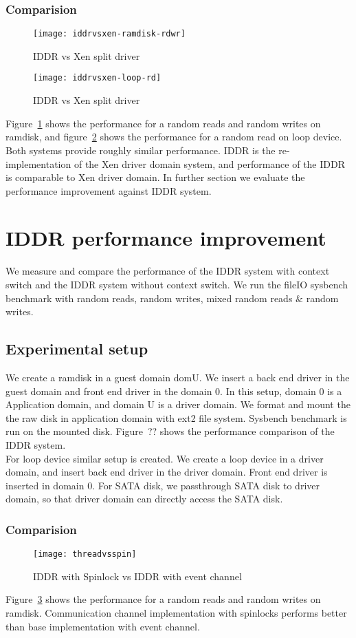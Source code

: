 \subsubsection*{Comparision}
\begin{figure}[!ht]
\centering
\texttt{[image: iddrvsxen-ramdisk-rdwr]}
\caption{IDDR vs Xen split driver}
\label{fig:iddrvsxen-ramdisk-rdwr}
\end{figure}
\begin{figure}[!ht]
\centering
\texttt{[image: iddrvsxen-loop-rd]}
\caption{IDDR vs Xen split driver}
\label{fig:iddrvsxen-loop-rd}
\end{figure}
Figure~\ref{fig:iddrvsxen-ramdisk-rdwr} shows the performance for a random reads and random writes on ramdisk, and figure~\ref{fig:iddrvsxen-loop-rd} shows the performance for a random read on loop device. Both systems provide roughly similar performance. IDDR is the re-implementation of the Xen driver domain system, and performance of the IDDR is comparable to Xen driver domain. In further section we evaluate the performance improvement against IDDR system.

\section{IDDR performance improvement}
We measure and compare the performance of the IDDR system with context switch and the IDDR system without context switch. We run the fileIO sysbench benchmark with random reads, random writes, mixed random reads $\&$ random writes. 
\subsection{Experimental setup}
We create a ramdisk in a guest domain domU. We insert a back end driver in the guest domain and front end driver in the domain 0. In this setup, domain 0 is a Application domain, and domain U is a driver domain. We format and mount the the raw disk in application domain with ext2 file system. Sysbench benchmark is run on the mounted disk. 
Figure~?? shows the performance comparison of the IDDR system.
\\[3mm]
For loop device similar setup is created. We create a loop device in a driver domain, and insert back end driver in the driver domain. Front end driver is inserted in domain 0. For SATA disk, we passthrough SATA disk to driver domain, so that driver domain can directly access the SATA disk. 
\subsubsection*{Comparision}
\begin{figure}[!ht]
\centering
\texttt{[image: threadvsspin]}
\caption{IDDR with Spinlock vs IDDR with event channel}
\label{fig:threadvsspin}
\end{figure}
Figure~\ref{fig:threadvsspin} shows the performance for a random reads and random writes on ramdisk. Communication channel implementation with spinlocks performs better than base implementation with event channel. 

\pagebreak

